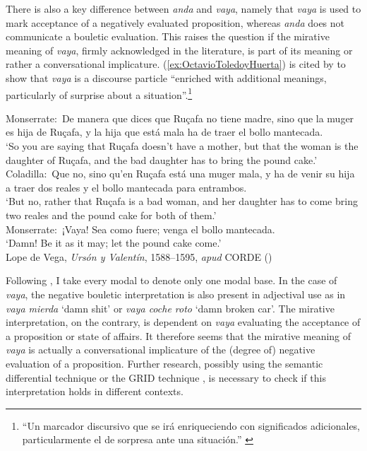There is also a key difference between \textit{anda} and \textit{vaya}, namely that \textit{vaya} is used to mark acceptance of a negatively evaluated proposition, whereas \textit{anda} does not communicate a bouletic evaluation. This raises the question if the mirative meaning of \textit{vaya}, firmly acknowledged in the literature, is part of its meaning or rather a conversational implicature. (\ref{ex:OctavioToledoyHuerta}) is cited by \citet[52]{OctaviodeToledoyHuerta.20012002} to show that \textit{vaya} is a discourse particle ``enriched with additional meanings, particularly of surprise about a situation''.\footnote{``Un marcador discursivo que se irá enriqueciendo con significados adicionales, particularmente el de sorpresa ante una situación.'' \citep[52]{OctaviodeToledoyHuerta.20012002}}

\begin{exe} 
	\ex \label{ex:OctavioToledoyHuerta} Monserrate:~De manera que dices que Ruçafa no tiene madre, sino que la muger es hija de Ruçafa, y la hija que está mala ha de traer el bollo mantecada.\\
	`So you are saying that Ruçafa doesn't have a mother, but that the woman is the daughter of Ruçafa, and the bad daughter has to bring the pound cake.'\\
	Coladilla:~Que no, sino qu'en Ruçafa está una muger mala, y ha de venir su hija a traer dos reales y el bollo mantecada para entrambos. \\
	`But no, rather that Ruçafa is a bad woman, and her daughter has to come bring two reales and the pound cake for both of them.'\\
	Monserrate:~¡Vaya! Sea como fuere; venga el bollo mantecada. \\
	`Damn! Be it as it may; let the pound cake come.'\\
	Lope de Vega, \textit{Ursón y Valentín}, 1588--1595, \textit{apud} CORDE (\citeauthor{RealAcademiaEspanola.CORDE})
\end{exe}

Following \citet{Kratzer.2012}, I take every modal to denote only one modal base. In the case of \textit{vaya}, the negative bouletic interpretation is also present in adjectival use as in \textit{vaya mierda} `damn shit' or \textit{vaya coche roto} `damn broken car'. The mirative interpretation, on the contrary, is dependent on \textit{vaya} evaluating the acceptance of a proposition or state of affairs. It therefore seems that the mirative meaning of \textit{vaya} is actually a conversational implicature of the (degree of) negative evaluation of a proposition. Further research, possibly using the semantic differential technique \citep{OsgoodETAL.1967,Kohler.2005} or the GRID technique \citep{FontaineSchererSoriano.2013}, is necessary to check if this interpretation holds in different contexts.	

